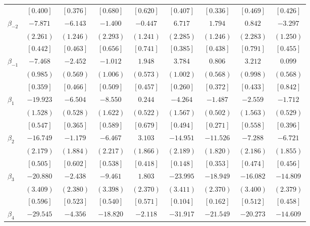 \documentclass[12pt]{article}
\begin{document}
\begin{table}[h!]
\begin{adjustbox}{width=\textwidth}
\begin{tabular}{lcccccccc}
& $[  0.400]$ & $[  0.376]$ & $[  0.680]$ & $[  0.620]$ & $[  0.407]$ & $[  0.336]$ & $[  0.469]$ & $[  0.426]$ \\
 $\beta_{-2}$  & $ -7.871$ & $ -6.143$ & $ -1.400$ & $ -0.447$ & $  6.717$ & $  1.794$ & $  0.842$ & $ -3.297$ \\
& $(  2.261)$ & $(  1.246)$ & $(  2.293)$ & $(  1.241)$ & $(  2.285)$ & $(  1.246)$ & $(  2.283)$ & $(  1.250)$ \\
& $[  0.442]$ & $[  0.463]$ & $[  0.656]$ & $[  0.741]$ & $[  0.385]$ & $[  0.438]$ & $[  0.791]$ & $[  0.455]$ \\
 $\beta_{-1}$  & $ -7.468$ & $ -2.452$ & $ -1.012$ & $  1.948$ & $  3.784$ & $  0.806$ & $  3.212$ & $  0.099$ \\
& $(  0.985)$ & $(  0.569)$ & $(  1.006)$ & $(  0.573)$ & $(  1.002)$ & $(  0.568)$ & $(  0.998)$ & $(  0.568)$ \\
& $[  0.359]$ & $[  0.466]$ & $[  0.509]$ & $[  0.457]$ & $[  0.260]$ & $[  0.372]$ & $[  0.433]$ & $[  0.842]$ \\
 $\beta_{1}$ & $-19.923$ & $ -6.504$ & $ -8.550$ & $  0.244$ & $ -4.264$ & $ -1.487$ & $ -2.559$ & $ -1.712$ \\
& $(  1.528)$ & $(  0.528)$ & $(  1.622)$ & $(  0.522)$ & $(  1.567)$ & $(  0.502)$ & $(  1.563)$ & $(  0.529)$ \\
& $[  0.547]$ & $[  0.365]$ & $[  0.589]$ & $[  0.679]$ & $[  0.494]$ & $[  0.271]$ & $[  0.558]$ & $[  0.396]$ \\
 $\beta_{2}$  & $-16.749$ & $ -1.179$ & $ -6.467$ & $  3.103$ & $-14.951$ & $-11.526$ & $ -7.288$ & $ -6.721$ \\
& $(  2.179)$ & $(  1.884)$ & $(  2.217)$ & $(  1.866)$ & $(  2.189)$ & $(  1.820)$ & $(  2.186)$ & $(  1.855)$ \\
& $[  0.505]$ & $[  0.602]$ & $[  0.538]$ & $[  0.418]$ & $[  0.148]$ & $[  0.353]$ & $[  0.474]$ & $[  0.456]$ \\
 $\beta_{3}$  & $-20.880$ & $ -2.438$ & $ -9.461$ & $  1.803$ & $-23.995$ & $-18.949$ & $-16.082$ & $-14.809$ \\
& $(  3.409)$ & $(  2.380)$ & $(  3.398)$ & $(  2.370)$ & $(  3.411)$ & $(  2.370)$ & $(  3.400)$ & $(  2.379)$ \\
& $[  0.596]$ & $[  0.523]$ & $[  0.540]$ & $[  0.571]$ & $[  0.104]$ & $[  0.162]$ & $[  0.512]$ & $[  0.458]$ \\
 $\beta_{4}$  & $-29.545$ & $ -4.356$ & $-18.820$ & $ -2.118$ & $-31.917$ & $-21.549$ & $-20.273$ & $-14.609$ \\

\end{tabular}
\end{adjustbox}
\end{table}
\end{document}
